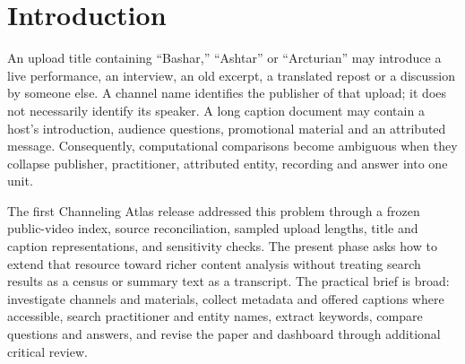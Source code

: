 \begin{abstract}
Public videos attributed to extraterrestrial (ET) channeling are distributed by practitioners, interviewers, archive accounts and repost publishers. A channel crawl can enlarge an index while leaving the speaker, original performance and substantive answer unresolved. This exploratory expansion of Channeling Atlas therefore treats collection, representation and interpretation as separate measurement stages. It preserves the prior \UploadN-upload snapshot, implements practitioner- and entity-aware search and channel collection, audits coverage and publishing concentration, and creates a source-addressable question-answer database from retained digest material. The available Q\&A layer contains \QAN\ AI-digest paraphrase candidates from \QAVideoN\ uploads and one practitioner context; it does not provide cross-practitioner transcript answers. Dictionary extraction and lexical retrieval expose repeated questions and answer vocabulary with source pointers, while the retained caption embeddings support bounded sensitivity diagnostics. New source collection outcomes are reported from actual request logs, including access denials, rather than inferred from installed tools or prepared queries. The resource links an expanded dashboard, executable analyses, generated plots, SQLite/JSON/CSV exports, and a living manuscript. Its contribution is an inspectable bridge from a heterogeneous public-video index to carefully typed analytical units. It does not establish extraterrestrial origins, answer truth, a population census, human construct validation, or independent peer review.
\end{abstract}

\section{Introduction}
An upload title containing ``Bashar,'' ``Ashtar'' or ``Arcturian'' may introduce a live performance, an interview, an old excerpt, a translated repost or a discussion by someone else. A channel name identifies the publisher of that upload; it does not necessarily identify its speaker. A long caption document may contain a host's introduction, audience questions, promotional material and an attributed message. Consequently, computational comparisons become ambiguous when they collapse publisher, practitioner, attributed entity, recording and answer into one unit.

The first Channeling Atlas release addressed this problem through a frozen public-video index, source reconciliation, sampled upload lengths, title and caption representations, and sensitivity checks. The present phase asks how to extend that resource toward richer content analysis without treating search results as a census or summary text as a transcript. The practical brief is broad: investigate channels and materials, collect metadata and offered captions where accessible, search practitioner and entity names, extract keywords, compare questions and answers, and revise the paper and dashboard through additional critical review.

